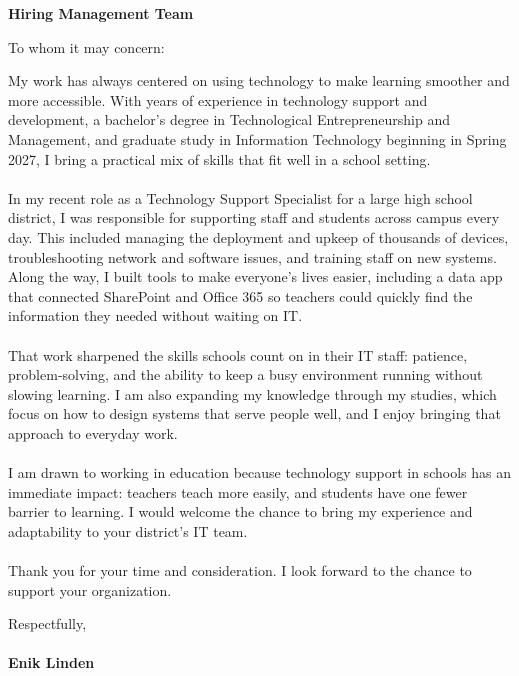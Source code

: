 
%



\vspace{1cm}

\large

\indent\textbf{Hiring Management Team}\\

\vspace{0.5cm}

\noindent To whom it may concern:

\vspace{0.5cm}

\justifying%
\noindent
My work has always centered on using technology to make learning smoother and more accessible. With years of experience in technology support and development, a bachelor's degree in Technological Entrepreneurship and Management, and graduate study in Information Technology beginning in Spring 2027, I bring a practical mix of skills that fit well in a school setting.\\\\
In my recent role as a Technology Support Specialist for a large high school district, I was responsible for supporting staff and students across campus every day. This included managing the deployment and upkeep of thousands of devices, troubleshooting network and software issues, and training staff on new systems. Along the way, I built tools to make everyone’s lives easier, including a data app that connected SharePoint and Office 365 so teachers could quickly find the information they needed without waiting on IT.\\\\
That work sharpened the skills schools count on in their IT staff: patience, problem‑solving, and the ability to keep a busy environment running without slowing learning. I am also expanding my knowledge through my studies, which focus on how to design systems that serve people well, and I enjoy bringing that approach to everyday work.\\\\
I am drawn to working in education because technology support in schools has an immediate impact: teachers teach more easily, and students have one fewer barrier to learning. I would welcome the chance to bring my experience and adaptability to your district’s IT team.\\\\
Thank you for your time and consideration. I look forward to the chance to support your organization.

\vspace{0.5cm}

\noindent Respectfully, \\\\
\noindent \textbf{Enik Linden}


